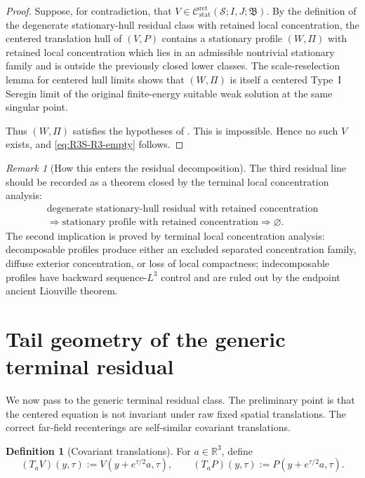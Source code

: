 \documentclass[11pt]{amsart}
\numberwithin{equation}{section}
\theoremstyle{plain}
\theoremstyle{definition}
\newtheorem{definition}[theorem]{Definition}
\theoremstyle{remark}
\newtheorem{remark}[theorem]{Remark}
\newcommand{\R}{\mathbb R}
\newcommand{\Cstat}{\mathcal C_{\mathrm{stat}}^{\mathrm{ret}}}
\begin{document}
\begin{proof}
Suppose, for contradiction, that
\(V\in\Cstat(\mathcal S;I,J;\mathfrak B)\).  By the
definition of the degenerate stationary-hull residual class with retained local
concentration, the centered translation hull of \((V,P)\) contains a stationary
profile \((W,\Pi)\) with retained local concentration
which lies in an admissible nontrivial stationary family and is outside the
previously closed lower classes.  The scale-reselection lemma for centered hull
limits shows that \((W,\Pi)\) is itself a centered Type~I Seregin limit of the
original finite-energy suitable weak solution at the same singular point.

Thus \((W,\Pi)\) satisfies the hypotheses of
.  This is impossible.  Hence no such
\(V\) exists, and \eqref{eq:R3S-R3-empty} follows.
\end{proof}

\begin{remark}[How this enters the residual decomposition]
\label{rem:R3S-decomposition}
The third residual line should be recorded as a theorem closed by the terminal
local concentration analysis:
\[
\begin{gathered}
   \text{degenerate stationary-hull residual with retained concentration}\\
   \Longrightarrow
   \text{stationary profile with retained concentration}
   \Longrightarrow
   \varnothing .
\end{gathered}
\]
The second implication is proved by terminal local concentration analysis:
decomposable profiles produce either an excluded separated concentration
family, diffuse exterior concentration, or loss of local compactness;
indecomposable profiles have backward sequence-\(L^3\) control and are ruled
out by the endpoint ancient Liouville theorem.
\end{remark}


\section{Tail geometry of the generic terminal residual}
\label{sec:R4-tail-geometry}

We now pass to the generic terminal residual class.  The preliminary point is that
the centered equation is not invariant under raw fixed spatial translations.
The correct far-field recenterings are self-similar covariant translations.

\begin{definition}[Covariant translations]
\label{def:covariant-translations}
For \(a\in\R^3\), define
\[
   (T_aV)(y,\tau):=V(y+e^{\tau/2}a,\tau),
   \qquad
   (T_aP)(y,\tau):=P(y+e^{\tau/2}a,\tau).
\]
\end{definition}
\end{document}
